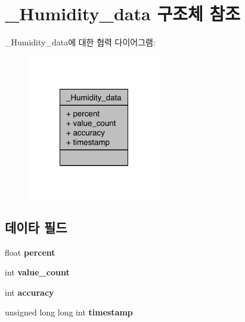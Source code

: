 \hypertarget{struct__Humidity__data}{\section{\-\_\-\-Humidity\-\_\-data 구조체 참조}
\label{struct__Humidity__data}
}


\-\_\-\-Humidity\-\_\-data에 대한 협력 다이어그램\-:\nopagebreak
\begin{figure}[H]
\begin{center}
\leavevmode
\includegraphics[width=164pt]{d5/da7/struct__Humidity__data__coll__graph}
\end{center}
\end{figure}
\subsection*{데이타 필드}
\begin{DoxyCompactItemize}
\item 
\hypertarget{struct__Humidity__data_aac167f3972a2f244f4b32c8ee5b89364}{float {\bfseries percent}}\label{struct__Humidity__data_aac167f3972a2f244f4b32c8ee5b89364}

\item 
\hypertarget{struct__Humidity__data_a40a079bfc72408819dc78da308203a74}{int {\bfseries value\-\_\-count}}\label{struct__Humidity__data_a40a079bfc72408819dc78da308203a74}

\item 
\hypertarget{struct__Humidity__data_a5565cf9073275f9713f9016e7c10d25f}{int {\bfseries accuracy}}\label{struct__Humidity__data_a5565cf9073275f9713f9016e7c10d25f}

\item 
\hypertarget{struct__Humidity__data_a8de02c4128636a7bf630ff5428f60c8d}{unsigned long long int {\bfseries timestamp}}\label{struct__Humidity__data_a8de02c4128636a7bf630ff5428f60c8d}

\end{DoxyCompactItemize}


